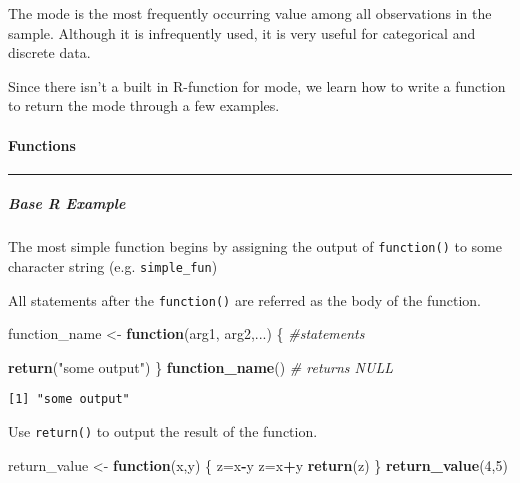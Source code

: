\documentclass[12pt,]{article}
\newenvironment{Shaded}{\begin{snugshade}}{\end{snugshade}}
\newcommand{\KeywordTok}[1]{\textcolor[rgb]{0.13,0.29,0.53}{\textbf{#1}}}
\newcommand{\DecValTok}[1]{\textcolor[rgb]{0.00,0.00,0.81}{#1}}
\newcommand{\StringTok}[1]{\textcolor[rgb]{0.31,0.60,0.02}{#1}}
\newcommand{\CommentTok}[1]{\textcolor[rgb]{0.56,0.35,0.01}{\textit{#1}}}
\newcommand{\ControlFlowTok}[1]{\textcolor[rgb]{0.13,0.29,0.53}{\textbf{#1}}}
\newcommand{\OperatorTok}[1]{\textcolor[rgb]{0.81,0.36,0.00}{\textbf{#1}}}
\newcommand{\NormalTok}[1]{#1}
\let\oldparagraph\paragraph
\renewcommand{\paragraph}[1]{\oldparagraph{#1}\mbox{}}
\let\oldsubparagraph\subparagraph
\renewcommand{\subparagraph}[1]{\oldsubparagraph{#1}\mbox{}}
\theoremstyle{definition}
\theoremstyle{definition}
\theoremstyle{definition}
\theoremstyle{remark}
\begin{document}
The mode is the most frequently occurring value among all observations
in the sample. Although it is infrequently used, it is very useful for
categorical and discrete data.

Since there isn't a built in R-function for mode, we learn how to write
a function to return the mode through a few examples.

\paragraph{Functions}\label{functions}

\begin{center}\rule{0.5\linewidth}{\linethickness}\end{center}

\subparagraph{Base R Example}\label{base-r-example}

The most simple function begins by assigning the output of
\texttt{function()} to some character string (e.g. \texttt{simple\_fun})

All statements after the \texttt{function()} are referred as the body of
the function.

\begin{Shaded}
\begin{Highlighting}[]
\NormalTok{function_name <-}\StringTok{ }\ControlFlowTok{function}\NormalTok{(arg1, arg2,...) \{}
  \CommentTok{#statements}
  
  \KeywordTok{return}\NormalTok{(}\StringTok{"some output"}\NormalTok{)}
\NormalTok{\}}
\KeywordTok{function_name}\NormalTok{() }\CommentTok{# returns NULL}
\end{Highlighting}
\end{Shaded}

\begin{verbatim}
[1] "some output"
\end{verbatim}

Use \texttt{return()} to output the result of the function.

\begin{Shaded}
\begin{Highlighting}[]
\NormalTok{return_value <-}\StringTok{ }\ControlFlowTok{function}\NormalTok{(x,y) \{}
\NormalTok{  z=x}\OperatorTok{-}\NormalTok{y  }
\NormalTok{  z=x}\OperatorTok{+}\NormalTok{y}
  \KeywordTok{return}\NormalTok{(z)}
\NormalTok{\}}
\KeywordTok{return_value}\NormalTok{(}\DecValTok{4}\NormalTok{,}\DecValTok{5}\NormalTok{) }
\end{Highlighting}
\end{Shaded}
\end{document}
